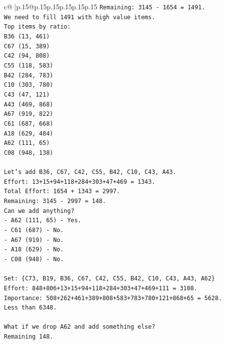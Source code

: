 \documentclass{article}
\begin{document}
{\begin{supertabular}{c@{$\;$}|p{.15\linewidth}@{}p{.15\linewidth}p{.15\linewidth}p{.15\linewidth}p{.15\linewidth}p{.15\linewidth}}
{{{\texttt{Remaining: 3145 {-} 1654 = 1491.} \\
\texttt{We need to fill 1491 with high value items.} \\
\texttt{Top items by ratio:} \\
\texttt{B36 (13, 461)} \\
\texttt{C67 (15, 389)} \\
\texttt{C42 (94, 808)} \\
\texttt{C55 (118, 583)} \\
\texttt{B42 (284, 783)} \\
\texttt{C10 (303, 780)} \\
\texttt{C43 (47, 121)} \\
\texttt{A43 (469, 868)} \\
\texttt{A67 (919, 822)} \\
\texttt{C61 (687, 668)} \\
\texttt{A18 (629, 484)} \\
\texttt{A62 (111, 65)} \\
\texttt{C08 (948, 138)} \\
\\ 
\texttt{Let's add B36, C67, C42, C55, B42, C10, C43, A43.} \\
\texttt{Effort: 13+15+94+118+284+303+47+469 = 1343.} \\
\texttt{Total Effort: 1654 + 1343 = 2997.} \\
\texttt{Remaining: 3145 {-} 2997 = 148.} \\
\texttt{Can we add anything?} \\
\texttt{{-} A62 (111, 65) {-} Yes.} \\
\texttt{{-} C61 (687) {-} No.} \\
\texttt{{-} A67 (919) {-} No.} \\
\texttt{{-} A18 (629) {-} No.} \\
\texttt{{-} C08 (948) {-} No.} \\
\\ 
\texttt{Set: \{C73, B19, B36, C67, C42, C55, B42, C10, C43, A43, A62\}} \\
\texttt{Effort: 848+806+13+15+94+118+284+303+47+469+111 = 3108.} \\
\texttt{Importance: 508+262+461+389+808+583+783+780+121+868+65 = 5628.} \\
\texttt{Less than 6348.} \\
\\ 
\texttt{What if we drop A62 and add something else?} \\
\texttt{Remaining 148.} \\
}}}
\end{supertabular}}
\end{document}
